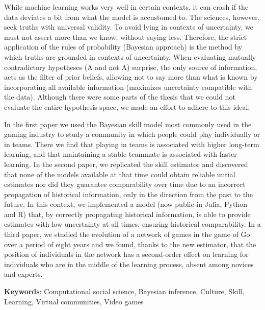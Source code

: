 \documentclass[a4paper,11pt]{book}
\theoremstyle{definition}
\begin{document}
While machine learning works very well in certain contexts, it can crash if the data deviates a bit from what the model is accustomed to.
The sciences, however, seek truths with universal validity.
To avoid lying in contexts of uncertainty, we must not assert more than we know, without saying less.
Therefore, the strict application of the rules of probability (Bayesian approach) is the method by which truths are grounded in contexts of uncertainty.
When evaluating mutually contradictory hypotheses (A and not A) surprise, the only source of information, acts as the filter of prior beliefs, allowing not to say more than what is known by incorporating all available information (maximizes uncertainty compatible with the data).
Although there were some parts of the thesis that we could not evaluate the entire hypothesis space, we made an effort to adhere to this ideal.


In the first paper we used the Bayesian skill model most commonly used in the gaming industry to study a community in which people could play individually or in teams.
There we find that playing in teams is associated with higher long-term learning, and that maintaining a stable teammate is associated with faster learning.
In the second paper, we replicated the skill estimator and discovered that none of the models available at that time could obtain reliable initial estimates nor did they guarantee comparability over time due to an incorrect propagation of historical information, only in the direction from the past to the future.
In this context, we implemented a model (now public in Julia, Python and R) that, by correctly propagating historical information, is able to provide estimates with low uncertainty at all times, ensuring historical comparability.
In a third paper, we studied the evolution of a network of games in the game of Go over a period of eight years and we found, thanks to the new estimator, that the position of individuals in the network has a second-order effect on learning for individuals who are in the middle of the learning process, absent among novices and experts.
%
\vspace{0.1cm}

\noindent \textbf{Keywords}: Computational social science, Bayesian inference, Culture, Skill, Learning, Virtual communities, Video games

\normalsize

\tableofcontents

\newpage
\end{document}

